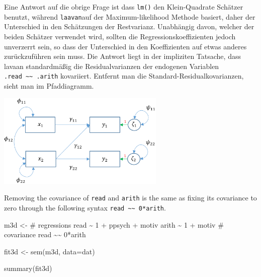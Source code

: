 \documentclass[
]{article}
\newenvironment{Shaded}{\begin{snugshade}}{\end{snugshade}}
\newcommand{\AttributeTok}[1]{\textcolor[rgb]{0.77,0.63,0.00}{#1}}
\newcommand{\FunctionTok}[1]{\textcolor[rgb]{0.00,0.00,0.00}{#1}}
\newcommand{\NormalTok}[1]{#1}
\newcommand{\OtherTok}[1]{\textcolor[rgb]{0.56,0.35,0.01}{#1}}
\newcommand{\StringTok}[1]{\textcolor[rgb]{0.31,0.60,0.02}{#1}}
\begin{document}
Eine Antwort auf die obrige Frage ist dass \texttt{lm()} den
Klein-Quadrate Schätzer benutzt, während \texttt{laavan}auf der
Maximum-likelihood Methode basiert, daher der Unterschied in den
Schätzungen der Restvarianz. Unabhängig davon, welcher der beiden
Schätzer verwendet wird, sollten die Regressionskoeffizienten jedoch
unverzerrt sein, so dass der Unterschied in den Koeffizienten auf etwas
anderes zurückzuführen sein muss. Die Antwort liegt in der impliziten
Tatsache, dass lavaan standardmäßig die Residualvarianzen der endogenen
Variablen \texttt{.read\ \textasciitilde{}\textasciitilde{}\ .arith}
kovariiert. Entfernt man die Standard-Residualkovarianzen, sieht man im
Pfaddiagramm.

\includegraphics[width=0.6\textwidth,height=\textheight]{m3d.png}

Removing the covariance of \texttt{read} and \texttt{arith} is the same
as fixing its covariance to zero through the following syntax
\texttt{read\ \textasciitilde{}\textasciitilde{}\ 0*arith}.

\begin{Shaded}
\begin{Highlighting}[]
\NormalTok{m3d }\OtherTok{\textless{}{-}} \StringTok{\textquotesingle{}\# regressions}
\StringTok{        read \textasciitilde{} 1 + ppsych + motiv}
\StringTok{        arith \textasciitilde{} 1 + motiv}
\StringTok{        \# covariance}
\StringTok{        read \textasciitilde{}\textasciitilde{} 0*arith }
\StringTok{        \textquotesingle{}}

\NormalTok{fit3d }\OtherTok{\textless{}{-}} \FunctionTok{sem}\NormalTok{(m3d, }\AttributeTok{data=}\NormalTok{dat)}

\FunctionTok{summary}\NormalTok{(fit3d)}
\end{Highlighting}
\end{Shaded}
\end{document}
